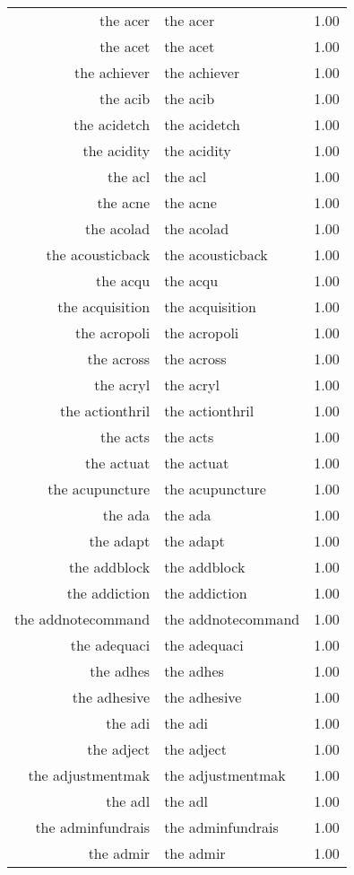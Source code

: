 \begin{table}[ht]
\begin{tabular}{rlr}
  the acer & the acer & 1.00 \\ 
  the acet & the acet & 1.00 \\ 
  the achiever & the achiever & 1.00 \\ 
  the acib & the acib & 1.00 \\ 
  the acidetch & the acidetch & 1.00 \\ 
  the acidity & the acidity & 1.00 \\ 
  the acl & the acl & 1.00 \\ 
  the acne & the acne & 1.00 \\ 
  the acolad & the acolad & 1.00 \\ 
  the acousticback & the acousticback & 1.00 \\ 
  the acqu & the acqu & 1.00 \\ 
  the acquisition & the acquisition & 1.00 \\ 
  the acropoli & the acropoli & 1.00 \\ 
  the across & the across & 1.00 \\ 
  the acryl & the acryl & 1.00 \\ 
  the actionthril & the actionthril & 1.00 \\ 
  the acts & the acts & 1.00 \\ 
  the actuat & the actuat & 1.00 \\ 
  the acupuncture & the acupuncture & 1.00 \\ 
  the ada & the ada & 1.00 \\ 
  the adapt & the adapt & 1.00 \\ 
  the addblock & the addblock & 1.00 \\ 
  the addiction & the addiction & 1.00 \\ 
  the addnotecommand & the addnotecommand & 1.00 \\ 
  the adequaci & the adequaci & 1.00 \\ 
  the adhes & the adhes & 1.00 \\ 
  the adhesive & the adhesive & 1.00 \\ 
  the adi & the adi & 1.00 \\ 
  the adject & the adject & 1.00 \\ 
  the adjustmentmak & the adjustmentmak & 1.00 \\ 
  the adl & the adl & 1.00 \\ 
  the adminfundrais & the adminfundrais & 1.00 \\ 
  the admir & the admir & 1.00 \\ 

\end{tabular}
\end{table}
